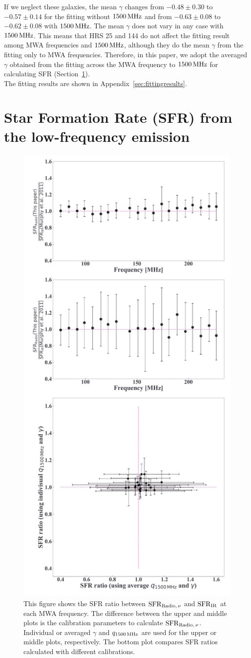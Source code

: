 If we neglect these galaxies, the mean $\gamma$ changes from $-0.48\pm0.30$ to $-0.57\pm0.14$ for the fitting without $1500\,\mathrm{MHz}$ and from $-0.63\pm0.08$ to $-0.62\pm0.08$ with $1500\,\mathrm{MHz}$.
The mean $\gamma$ does not vary in any case with $1500\,\mathrm{MHz}$.
This means that HRS 25 and 144 do not affect the fitting result among MWA frequencies and $1500\,\mathrm{MHz}$, although they do the mean $\gamma$ from the fitting only to MWA frequencies.
Therefore, in this paper, we adopt the averaged $\gamma$ obtained from the fitting across the MWA frequency to $1500\,\mathrm{MHz}$ for calculating SFR (Section~\ref{subsec:sfrfromlowradio}).\\
The fitting results are shown in Appendix~\ref{sec:fittingresults}.



\section{Star Formation Rate (SFR) from the low-frequency emission}\label{subsec:sfrfromlowradio}

\begin{figure}[htbp]
	\centering
	\includegraphics[width=.6\linewidth]{Chapter_5/Figures/Result_sfrratio.pdf}
    \caption[The consistency of the radio SFR]{\label{fig:sfrratio}
        This figure shows the SFR ratio between $\mathrm{SFR}_{\mathrm{Radio},\,\nu}$ and $\mathrm{SFR}_{\mathrm{IR}}$ at each MWA frequency.
        The difference between the upper and middle plots is the calibration parameters to calculate $\mathrm{SFR}_{\mathrm{Radio},\,\nu}$.
        Individual or averaged $\gamma$ and $q_{\mathrm{1500\,\mathrm{MHz}}}$ are used for the upper or middle plots, respectively.
    The bottom plot compares SFR ratios calculated with different calibrations.
    }
\end{figure}

